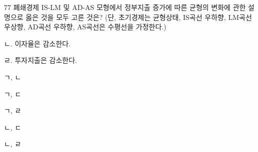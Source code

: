 \begin{question}{77}
폐쇄경제 IS-LM 및 AD-AS 모형에서 정부지출 증가에 따른 균형의 변화에 관한 설명으로 옳은 것을 모두 고른 것은? (단, 초기경제는 균형상태, IS곡선 우하향, LM곡선 우상향, AD곡선 우하향, AS곡선은 수평선을 가정한다.)
\begin{framedtext}
ㄴ. 이자율은 감소한다. \par
{}ㄹ. 투자지출은 감소한다. \par
\end{framedtext}
\begin{choices}
  \item ㄱ, ㄴ
  \item ㄱ, ㄷ
  \item ㄱ, ㄹ
  \item ㄴ, ㄷ
  \item ㄴ, ㄹ
\end{choices}
\end{question}
